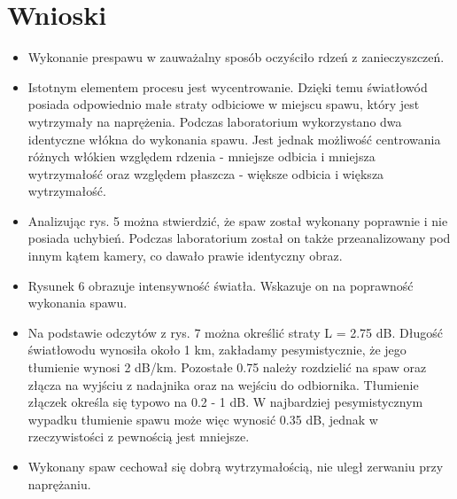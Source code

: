 \documentclass[12pt, a4paper, oneside]{article}
\begin{document}
\section{Wnioski}
\begin{itemize}
\item Wykonanie prespawu w zauważalny sposób oczyściło rdzeń z zanieczyszczeń.
\item Istotnym elementem procesu jest wycentrowanie. Dzięki temu światłowód posiada odpowiednio małe straty odbiciowe w miejscu spawu, który jest wytrzymały na naprężenia. Podczas laboratorium wykorzystano dwa identyczne włókna do wykonania spawu. Jest jednak możliwość centrowania różnych włókien względem rdzenia - mniejsze odbicia i mniejsza wytrzymałość oraz względem płaszcza - większe odbicia i większa wytrzymałość.
\item Analizując rys. 5 można stwierdzić, że spaw został wykonany poprawnie i nie posiada uchybień. Podczas laboratorium został on także przeanalizowany pod innym kątem kamery, co dawało prawie identyczny obraz.
\item Rysunek 6 obrazuje intensywność światła. Wskazuje on na poprawność wykonania spawu.
\item Na podstawie odczytów z rys. 7 można określić straty L = 2.75 dB. Długość światłowodu wynosiła około 1 km, zakładamy pesymistycznie, że jego tłumienie wynosi 2 dB/km. Pozostałe 0.75 należy rozdzielić na spaw oraz złącza na wyjściu z nadajnika oraz na wejściu do odbiornika. Tłumienie złączek określa się typowo na 0.2 - 1 dB. W najbardziej pesymistycznym wypadku tłumienie spawu może więc wynosić 0.35 dB, jednak w rzeczywistości z pewnością jest mniejsze.
\item Wykonany spaw cechował się dobrą wytrzymałością, nie uległ zerwaniu przy naprężaniu.
\end{itemize}
\end{document}
